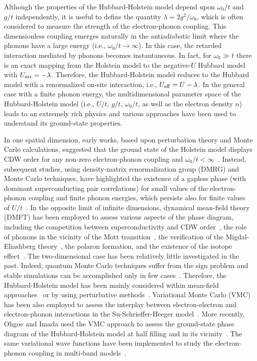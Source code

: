 \documentclass[aps,superscriptaddress,amsmath,amssymb,twocolumn,showpacs,floatfix,english]{revtex4}
\begin{document}
Although the properties of the Hubbard-Holstein model depend upon $\omega_0/t$ and $g/t$ independently, it is useful to define the
quantity $\lambda=2g^2/\omega_0$, which is often considered to measure the strength of the electron-phonon coupling. This dimensionless 
coupling emerges naturally in the antiadiabatic limit where the phonons have a large energy (i.e., $\omega_0/t \to \infty$). In this 
case, the retarded interaction mediated by phonons becomes instantaneous. In fact, for $\omega_0 \gg t$ there is an exact mapping from 
the Holstein model to the negative-$U$ Hubbard model with $U_{\rm att}=-\lambda$. Therefore, the Hubbard-Holstein model reduces to the 
Hubbard model with a renormalized on-site interaction, i.e., $U_{\rm eff}=U-\lambda$. In the general case with a finite phonon energy, 
the multidimensional parameter space of the Hubbard-Holstein model (i.e., $U/t$, $g/t$, $\omega_0/t$, as well as the electron density 
$n$) leads to an extremely rich physics and various approaches have been used to understand its ground-state properties. 

In one spatial dimension, early works, based upon perturbation theory and Monte Carlo calculations, suggested that the ground state of
the Holstein model displays CDW order for any non-zero electron-phonon coupling and $\omega_0/t<\infty$~\cite{Hirsch1983,Zheng1989}. 
Instead, subsequent studies, using density-matrix renormalization group (DMRG) and Monte Carlo techniques, have highlighted the existence 
of a  gapless phase (with dominant superconducting pair correlations) for small values of the electron-phonon coupling and finite phonon 
energies, which persists also for finite values of $U/t$~\cite{Jeckelmann1998,Jeckelmann1999,Clay2005,Tezuka2007,Fehske2008,Hohenadler2013}. 
In the opposite limit  of infinite dimensions, dynamical mean-field theory (DMFT) has been employed to assess various aspects of the phase 
diagram, including the competition between superconductivity and CDW order~\cite{Freericks1993,Freericks1995,Bauer2010,Murakami2013}, 
the role of phonons in the vicinity of the Mott transition~\cite{Capone2004,Sangiovanni2005}, the verification of the Migdal-Eliashberg 
theory~\cite{Werner2007}, the polaron formation, and the existence of the isotope effect~\cite{Capone2003,Paci2005,Macridin2006}. 
The two-dimensional case has been relatively little investigated in the past. Indeed, quantum Monte Carlo techniques suffer from the 
sign problem and stable simulations can be accomplished only in few cases~\cite{Huang2003,Nowadnick2012,Johnston2013}. Therefore, the 
Hubbard-Holstein model has been mainly considered within mean-field approaches~\cite{Becca1996,Zeyer1996,Barone2008,diCiolo2009} or
by using perturbative methods~\cite{Berger1995,Hotta1997}. Variational Monte Carlo (VMC) has been also employed to assess the interplay 
between electron-electron and electron-phonon interactions in the Su-Schrieffer-Heeger model~\cite{Alder1997}. More recently, Ohgoe and 
Imada used the VMC approach to assess the ground-state phase diagram of the Hubbard-Holstein model at half filling and in its 
vicinity~\cite{Ohgoe2017}. The same variational wave functions have been implemented to study the electron-phonon coupling in multi-band 
models~\cite{Watanabe2015}.
\end{document}
